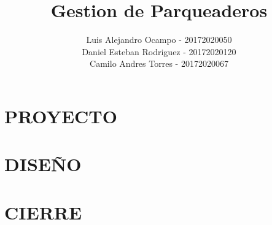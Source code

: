 \documentclass[11pt,twoside,letterpaper]{book}
\title{Gestion de Parqueaderos}
\author{Luis Alejandro Ocampo - 20172020050\\
Daniel Esteban Rodriguez - 20172020120\\
Camilo Andres Torres - 20172020067}
\begin{document}
\maketitle
\tableofcontents
\listoffigures
\part{PROYECTO}



\part{DISEÑO}









\part{CIERRE}




\end{document}
